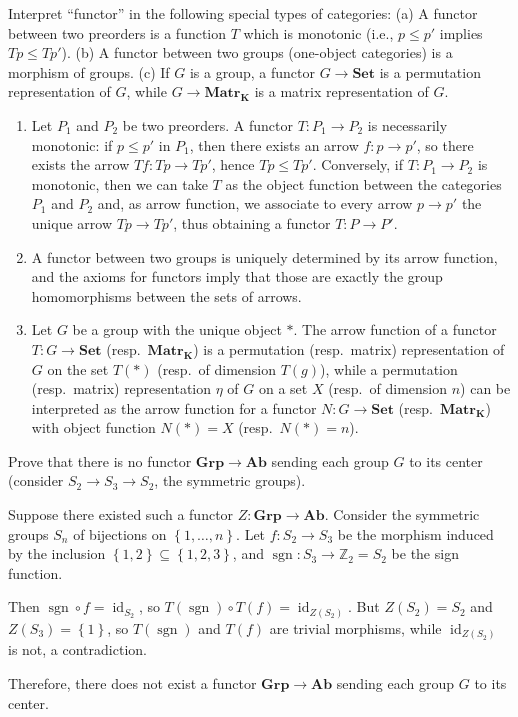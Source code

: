 \begin{exercise}
Interpret ``functor'' in the following special types of categories: (a) A functor between two preorders is a function $T$ which is monotonic (i.e., $p\leq p'$ implies $Tp\leq Tp'$). (b) A functor between two groups (one-object categories) is a morphism of groups. (c) If $G$ is a group, a functor $G\to\mathbf{Set}$ is a permutation representation of $G$, while $G\to\mathbf{Matr_K}$ is a matrix representation of $G$.
\end{exercise}
\begin{solution}
\begin{enumerate}
\item[(a)] Let $P_1$ and $P_2$ be two preorders. A functor $T:P_1\to P_2$ is necessarily monotonic: if $p\leq p'$ in $P_1$, then there exists an arrow $f:p\to p'$, so there exists the arrow $Tf:Tp\to Tp'$, hence $Tp\leq Tp'$. Conversely, if $T:P_1\to P_2$ is monotonic, then we can take $T$ as the object function between the categories $P_1$ and $P_2$ and, as arrow function, we associate to every arrow $p\to p'$ the unique arrow $Tp\to Tp'$, thus obtaining a functor $T:P\to P'$.
\item[(b)] A functor between two groups is uniquely determined by its arrow function, and the axioms for functors imply that those are exactly the group homomorphisms between the sets of arrows.
\item[(c)] Let $G$ be a group with the unique object $\ast$. The arrow function of a functor $T:G\to\mathbf{Set}$ (resp.\ $\mathbf{Matr_K}$) is a permutation (resp.\ matrix) representation of $G$ on the set $T(\ast)$ (resp.\ of dimension $T(g)$), while a permutation (resp.\ matrix) representation $\eta$ of $G$ on a set $X$ (resp.\ of dimension $n$) can be interpreted as the arrow function for a functor $N:G\to\mathbf{Set}$ (resp.\ $\mathbf{Matr_K}$) with object function $N(\ast)=X$ (resp.\ $N(\ast)=n$).
\end{enumerate}
\end{solution}

\begin{exercise}
Prove that there is no functor $\mathbf{Grp}\to\mathbf{Ab}$ sending each group $G$ to its center (consider $S_2\to S_3\to S_2$, the symmetric groups).
\end{exercise}
\begin{solution}
Suppose there existed such a functor $Z:\mathbf{Grp}\to\mathbf{Ab}$. Consider the symmetric groups $S_n$ of bijections on $\left\{1,\ldots,n\right\}$. Let $f:S_2\to S_3$ be the morphism induced by the inclusion $\left\{1,2\right\}\subseteq\left\{1,2,3\right\}$, and $\operatorname{sgn}:S_3\to \mathbb{Z}_2=S_2$ be the sign function. 

Then $\operatorname{sgn}\circ f=\operatorname{id}_{S_2}$, so $T(\operatorname{sgn})\circ T(f)=\operatorname{id}_{Z(S_2)}$. But $Z(S_2)=S_2$ and $Z(S_3)=\left\{1\right\}$, so $T(\operatorname{sgn})$ and $T(f)$ are trivial morphisms, while $\operatorname{id}_{Z(S_2)}$ is not, a contradiction.

Therefore, there does not exist a functor $\mathbf{Grp}\to\mathbf{Ab}$ sending each group $G$ to its center.
\end{solution}

